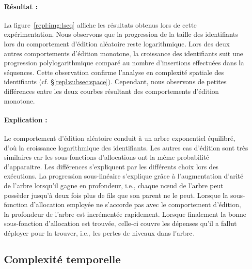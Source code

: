 \paragraph{Résultat :} La figure~\ref{repl:img:lseq} affiche les résultats
obtenus lors de cette expérimentation. Nous observons que la progression de la
taille des identifiants lors du comportement d'édition aléatoire reste
logarithmique. Lors des deux autres comportements d'édition monotone, la
croissance des identifiants suit une progression polylogarithmique comparé au
nombre d'insertions effectuées dans la séquences. Cette observation confirme
l'analyse en complexité spatiale des identifiants
(cf. §\ref{repl:subsec:space}). Cependant, nous observons de petites
différences entre les deux courbes résultant des comportements d'édition monotone.

\paragraph{Explication :} Le comportement d'édition aléatoire conduit à un arbre
exponentiel équilibré, d'où la croissance logarithmique des identifiants. Les
autres cas d'édition sont très similaires car les sous-fonctions d'allocations
ont la même probabilité d'apparaitre. Les différences s'expliquent par les
différents choix lors des exécutions. La progression sous-linéaire s'explique
grâce à l'augmentation d'arité de l'arbre lorsqu'il gagne en profondeur, i.e.,
chaque nœud de l'arbre peut possèder jusqu'à deux fois plus de fils que son
parent ne le peut. Lorsque la sous-fonction d'allocation employée ne s'accorde
pas avec le comportement d'édition, la profondeur de l'arbre est incrémentée
rapidement. Lorsque finalement la bonne sous-fonction d'allocation est trouvée,
celle-ci couvre les dépenses qu'il a fallut déployer pour la trouver, i.e.,
les pertes de niveaux dans l'arbre.

\subsection{Complexité temporelle}

